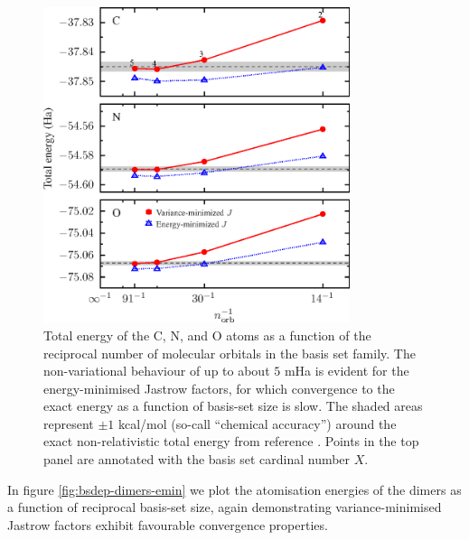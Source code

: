 \begin{figure}[htbp]
    \centering
    \includegraphics[width=0.8\textwidth]{figures/optimisation/Fig/bsdep-atoms-emin}
    \caption{Total energy of the C, N, and O atoms as a function of the reciprocal number of molecular orbitals in the  basis set family. The non-variational behaviour of up to about $5$ mHa is evident for the energy-minimised Jastrow factors, for which convergence to the exact energy as a function of basis-set size is slow. The shaded areas represent $\pm 1$ kcal/mol (so-call ``chemical accuracy'') around the exact non-relativistic total energy from reference . Points in the top panel are annotated with the basis set cardinal number $X$.}
    \label{fig:bsdep-atoms-emin}
\end{figure}

In figure \ref{fig:bsdep-dimers-emin} we plot the atomisation energies of the dimers as a function of reciprocal basis-set size, again demonstrating variance-minimised Jastrow factors exhibit favourable convergence properties.

